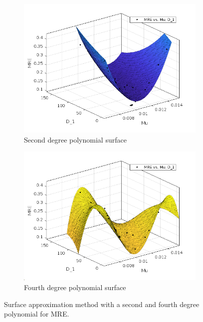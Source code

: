 \begin{figure}
    \centering
    \begin{subfigure}[b]{0.45\textwidth}
    \centering
    \includegraphics[width=\textwidth]{Images/ifem/MATLAB/MRE2poly.png}
    \caption{Second degree polynomial surface}
    \label{fig:poly2MRE}
    \end{subfigure}
    \hfill
    \begin{subfigure}[b]{0.45\textwidth}
    \centering
    \includegraphics[width=\textwidth]{Images/ifem/MATLAB/MRE4poly.png}
    \caption{Fourth degree polynomial surface}
    \label{fig:poly4MRE}
    \end{subfigure}
    \hspace{0.3cm}
    \caption[Polynomial approximation surfaces-MRE]{Surface approximation method with a second and fourth degree polynomial for MRE.}
    \label{fig:poly2and4MRE}
\end{figure}
